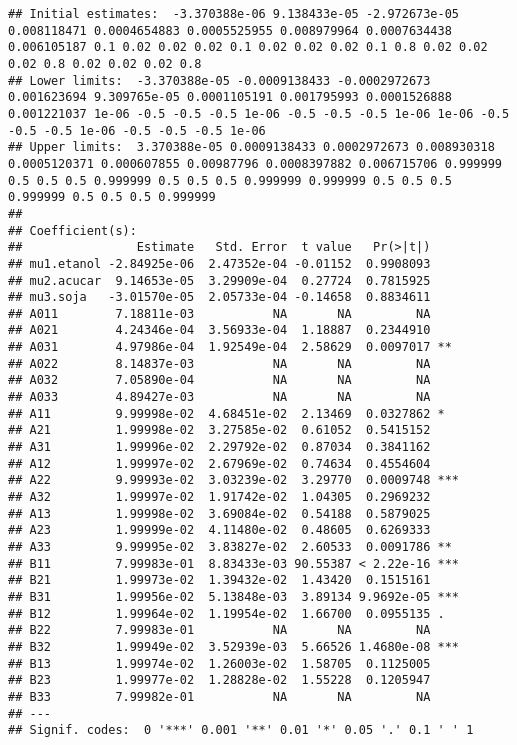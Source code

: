 \documentclass[]{article}
\begin{document}
\begin{verbatim}
## Initial estimates:  -3.370388e-06 9.138433e-05 -2.972673e-05 0.008118471 0.0004654883 0.0005525955 0.008979964 0.0007634438 0.006105187 0.1 0.02 0.02 0.02 0.1 0.02 0.02 0.02 0.1 0.8 0.02 0.02 0.02 0.8 0.02 0.02 0.02 0.8 
## Lower limits:  -3.370388e-05 -0.0009138433 -0.0002972673 0.001623694 9.309765e-05 0.0001105191 0.001795993 0.0001526888 0.001221037 1e-06 -0.5 -0.5 -0.5 1e-06 -0.5 -0.5 -0.5 1e-06 1e-06 -0.5 -0.5 -0.5 1e-06 -0.5 -0.5 -0.5 1e-06 
## Upper limits:  3.370388e-05 0.0009138433 0.0002972673 0.008930318 0.0005120371 0.000607855 0.00987796 0.0008397882 0.006715706 0.999999 0.5 0.5 0.5 0.999999 0.5 0.5 0.5 0.999999 0.999999 0.5 0.5 0.5 0.999999 0.5 0.5 0.5 0.999999 
## 
## Coefficient(s):
##                Estimate   Std. Error  t value   Pr(>|t|)    
## mu1.etanol -2.84925e-06  2.47352e-04 -0.01152  0.9908093    
## mu2.acucar  9.14653e-05  3.29909e-04  0.27724  0.7815925    
## mu3.soja   -3.01570e-05  2.05733e-04 -0.14658  0.8834611    
## A011        7.18811e-03           NA       NA         NA    
## A021        4.24346e-04  3.56933e-04  1.18887  0.2344910    
## A031        4.97986e-04  1.92549e-04  2.58629  0.0097017 ** 
## A022        8.14837e-03           NA       NA         NA    
## A032        7.05890e-04           NA       NA         NA    
## A033        4.89427e-03           NA       NA         NA    
## A11         9.99998e-02  4.68451e-02  2.13469  0.0327862 *  
## A21         1.99998e-02  3.27585e-02  0.61052  0.5415152    
## A31         1.99996e-02  2.29792e-02  0.87034  0.3841162    
## A12         1.99997e-02  2.67969e-02  0.74634  0.4554604    
## A22         9.99993e-02  3.03239e-02  3.29770  0.0009748 ***
## A32         1.99997e-02  1.91742e-02  1.04305  0.2969232    
## A13         1.99998e-02  3.69084e-02  0.54188  0.5879025    
## A23         1.99999e-02  4.11480e-02  0.48605  0.6269333    
## A33         9.99995e-02  3.83827e-02  2.60533  0.0091786 ** 
## B11         7.99983e-01  8.83433e-03 90.55387 < 2.22e-16 ***
## B21         1.99973e-02  1.39432e-02  1.43420  0.1515161    
## B31         1.99956e-02  5.13848e-03  3.89134 9.9692e-05 ***
## B12         1.99964e-02  1.19954e-02  1.66700  0.0955135 .  
## B22         7.99983e-01           NA       NA         NA    
## B32         1.99949e-02  3.52939e-03  5.66526 1.4680e-08 ***
## B13         1.99974e-02  1.26003e-02  1.58705  0.1125005    
## B23         1.99977e-02  1.28828e-02  1.55228  0.1205947    
## B33         7.99982e-01           NA       NA         NA    
## ---
## Signif. codes:  0 '***' 0.001 '**' 0.01 '*' 0.05 '.' 0.1 ' ' 1
\end{verbatim}
\end{document}
